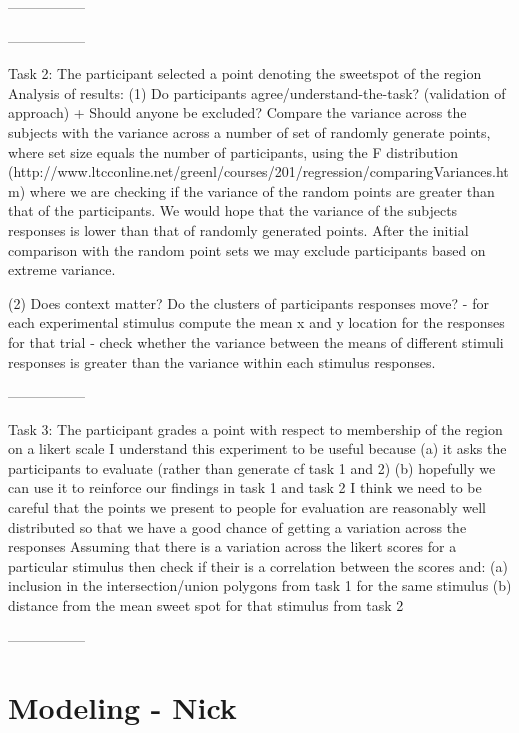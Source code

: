 \documentclass[11pt,letterpaper]{article}
\begin{document}
-----------------


-----------------

Task 2: The participant selected a point denoting the sweetspot of the region
Analysis of results:
(1) Do participants agree/understand-the-task? (validation of approach) + Should anyone be excluded?
Compare the variance across the subjects with the variance across a number of set of randomly generate points, where set size equals the number of participants, using the F distribution (http://www.ltcconline.net/greenl/courses/201/regression/comparingVariances.htm) where we are checking if the variance of the random points are greater than that of the participants.
We would hope that the variance of the subjects responses is lower than that of randomly generated points.
After the initial comparison with the random point sets we may exclude participants based on extreme variance.
 
(2) Does context matter?
Do the clusters of participants responses move?
- for each experimental stimulus compute the mean x and y location for the responses for that trial
- check whether the variance between the means of different stimuli responses is greater than the variance within each stimulus responses.

-----------------


Task 3: The participant grades a point with respect to membership of the region on a likert scale
I understand this experiment to be useful because (a) it asks the participants to evaluate (rather than generate cf task 1 and 2) (b) hopefully we can use it to reinforce our findings in task 1 and task 2
I think we need to be careful that the points we present to people for evaluation are reasonably well distributed so that we have a good chance of getting a variation across the responses
Assuming that there is a variation across the likert scores for a particular stimulus then check if their is a correlation between the scores and:
(a) inclusion in the intersection/union polygons from task 1 for the same stimulus
(b) distance from the mean sweet spot for that stimulus from task 2

-----------------
 




\section{Modeling - Nick}
\end{document}

